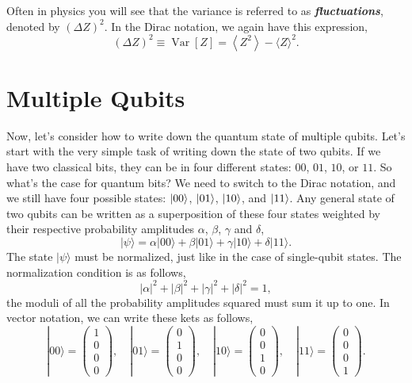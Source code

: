 Often in physics you will see that the variance is referred to as \textbf{\emph{fluctuations}}, denoted by $(\Delta Z)^2$. In the Dirac notation, we again have this expression,
\begin{equation}
    (\Delta Z)^{2} \equiv \operatorname{Var}[Z] = \left\langle Z^{2}\right\rangle-\langle Z\rangle^{2}.
\end{equation}





\section{Multiple Qubits}
\label{sec:multi-qubit}

Now, let's consider how to write down the quantum state of multiple qubits. Let's start with the very simple task of writing down the state of two qubits. If we have two classical bits, they can be in four different states: $00$, $01$, $10$, or $11$. So what's the case for quantum bits? We need to switch to the Dirac notation, and we still have four possible states: $\left| 00 \right\rangle$, $\left| 01 \right\rangle$, $\left| 10 \right\rangle$, and $\left| 11 \right\rangle$. Any general state of two qubits can be written as a superposition of these four states weighted by their respective probability amplitudes $\alpha$, $\beta$, $\gamma$ and $\delta$, 
\begin{equation}
    |\psi\rangle=\alpha|00\rangle+\beta|01\rangle+\gamma|10\rangle+\delta|11\rangle.
    \label{eq:superposition_2qubits}
\end{equation}
The state $|\psi\rangle$ must be normalized, just like in the case of single-qubit states. The normalization condition is as follows,
\begin{equation}
    |\alpha|^2+|\beta|^2+|\gamma|^2+|\delta|^2 = 1,
\end{equation}
the moduli of all the probability amplitudes squared must sum it up to one.
In vector notation, we can write these kets as follows,
\begin{equation}
|00\rangle=\left(\begin{array}{l}
1 \\
0 \\
0 \\
0
\end{array}\right), \quad |01\rangle=\left(\begin{array}{l}
0 \\
1 \\
0 \\
0
\end{array}\right), \quad |10\rangle=\left(\begin{array}{l}
0 \\
0 \\
1 \\
0
\end{array}\right), \quad |11\rangle=\left(\begin{array}{l}
0 \\
0 \\
0 \\
1
\end{array}\right).
\end{equation}
